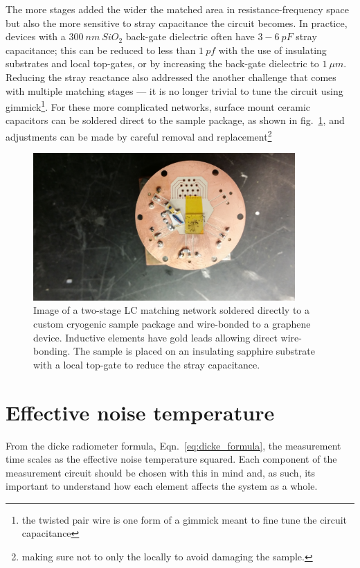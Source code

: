 The more stages added the wider the matched area in resistance-frequency space but also the more sensitive to stray capacitance the circuit becomes. In practice, devices with a $300~nm~SiO_2$ back-gate dielectric often have $3-6~pF$ stray capacitance; this can be reduced to less than $1~pf$ with the use of insulating substrates and local top-gates, or by increasing the back-gate dielectric to $1~\mu m$. Reducing the stray reactance also addressed the another challenge that comes with multiple matching stages --- it is no longer trivial to tune the circuit using gimmick\footnote{the twisted pair wire is one form of a gimmick meant to fine tune the circuit capacitance}. For these more complicated networks, surface mount ceramic capacitors can be soldered direct to the sample package, as shown in fig.~\ref{fig:picture_doubleLC}, and adjustments can be made by careful removal and replacement\footnote{making sure not to only the locally to avoid damaging the sample.}
\begin{figure}
\centering
\includegraphics[width = 100mm]{figures/Johnson_noise_thermometry/picture_matching_ceramic}
\caption{Image of a two-stage LC matching network soldered directly to a custom cryogenic sample package and wire-bonded to a graphene device. Inductive elements have gold leads allowing direct wire-bonding. The sample is placed on an insulating sapphire substrate with a local top-gate to reduce the stray capacitance.}
\label{fig:picture_doubleLC}
\end{figure}

\section{Effective noise temperature}
 From the dicke radiometer formula, Eqn.~\ref{eq:dicke_formula}, the measurement time scales as the effective noise temperature squared. Each component of the measurement circuit should be chosen with this in mind and, as such, its important to understand how each element affects the system as a whole.

